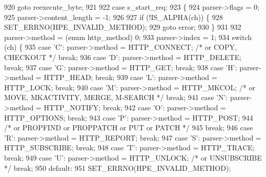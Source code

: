 \begin{DoxyCode}
920         \textcolor{keywordflow}{goto} reexecute\_byte;
921 
922       \textcolor{keywordflow}{case} s_start_req:
923       \{
924         parser->flags = 0;
925         parser->content_length = -1;
926 
927         \textcolor{keywordflow}{if} (!IS_ALPHA(ch)) \{
928           SET_ERRNO(HPE_INVALID_METHOD);
929           \textcolor{keywordflow}{goto} error;
930         \}
931 
932         parser->method = (\textcolor{keyword}{enum} http_method) 0;
933         parser->index = 1;
934         \textcolor{keywordflow}{switch} (ch) \{
935           \textcolor{keywordflow}{case} \textcolor{charliteral}{'C'}: parser->method = HTTP_CONNECT; \textcolor{comment}{/* or COPY, CHECKOUT */} \textcolor{keywordflow}{break};
936           \textcolor{keywordflow}{case} \textcolor{charliteral}{'D'}: parser->method = HTTP_DELETE; \textcolor{keywordflow}{break};
937           \textcolor{keywordflow}{case} \textcolor{charliteral}{'G'}: parser->method = HTTP_GET; \textcolor{keywordflow}{break};
938           \textcolor{keywordflow}{case} \textcolor{charliteral}{'H'}: parser->method = HTTP_HEAD; \textcolor{keywordflow}{break};
939           \textcolor{keywordflow}{case} \textcolor{charliteral}{'L'}: parser->method = HTTP_LOCK; \textcolor{keywordflow}{break};
940           \textcolor{keywordflow}{case} \textcolor{charliteral}{'M'}: parser->method = HTTP_MKCOL; \textcolor{comment}{/* or MOVE, MKACTIVITY, MERGE, M-SEARCH */} \textcolor{keywordflow}{break};
941           \textcolor{keywordflow}{case} \textcolor{charliteral}{'N'}: parser->method = HTTP_NOTIFY; \textcolor{keywordflow}{break};
942           \textcolor{keywordflow}{case} \textcolor{charliteral}{'O'}: parser->method = HTTP_OPTIONS; \textcolor{keywordflow}{break};
943           \textcolor{keywordflow}{case} \textcolor{charliteral}{'P'}: parser->method = HTTP_POST;
944             \textcolor{comment}{/* or PROPFIND or PROPPATCH or PUT or PATCH */}
945             \textcolor{keywordflow}{break};
946           \textcolor{keywordflow}{case} \textcolor{charliteral}{'R'}: parser->method = HTTP_REPORT; \textcolor{keywordflow}{break};
947           \textcolor{keywordflow}{case} \textcolor{charliteral}{'S'}: parser->method = HTTP_SUBSCRIBE; \textcolor{keywordflow}{break};
948           \textcolor{keywordflow}{case} \textcolor{charliteral}{'T'}: parser->method = HTTP_TRACE; \textcolor{keywordflow}{break};
949           \textcolor{keywordflow}{case} \textcolor{charliteral}{'U'}: parser->method = HTTP_UNLOCK; \textcolor{comment}{/* or UNSUBSCRIBE */} \textcolor{keywordflow}{break};
950           \textcolor{keywordflow}{default}:
951             SET_ERRNO(HPE_INVALID_METHOD);

\end{DoxyCode}
